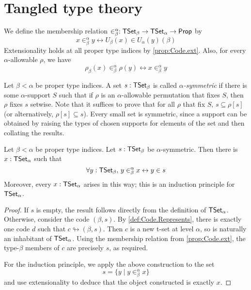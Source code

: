 \section{Tangled type theory}
\begin{definition}
  \label{def:TSet.mem}
  We define the membership relation \( \in^\alpha_\beta : \mathsf{TSet}_\beta \to \mathsf{TSet}_\alpha \to \mathsf{Prop} \) by
  \[ x \in^\alpha_\beta y \leftrightarrow U_\beta(x) \in U_\alpha(y)(\beta) \]
  Extensionality holds at all proper type indices by \cref{prop:Code.ext}.
  Also, for every \( \alpha \)-allowable \( \rho \), we have
  \[ \rho_\beta(x) \in^\alpha_\beta \rho(y) \leftrightarrow x \in^\alpha_\beta y \]
\end{definition}
\begin{definition}[symmetric]
  \label{def:Symmetric}
  Let \( \beta < \alpha \) be proper type indices.
  A set \( s : \mathsf{TSet}_\beta \) is called \emph{\( \alpha \)-symmetric} if there is some \( \alpha \)-support \( S \) such that if \( \rho \) is an \( \alpha \)-allowable permutation that fixes \( S \), then \( \rho \) fixes \( s \) setwise.
  Note that it suffices to prove that for all \( \rho \) that fix \( S \), \( s \subseteq \rho[s] \) (or alternatively, \( \rho[s] \subseteq s \)).
  Every small set is symmetric, since a support can be obtained by raising the types of chosen supports for elements of the set and then collating the results.
\end{definition}
\begin{proposition}
  \label{prop:TSet.of_symmetric}
  Let \( \beta < \alpha \) be proper type indices.
  Let \( s : \mathsf{TSet}_\beta \) be \( \alpha \)-symmetric.
  Then there is \( x : \mathsf{TSet}_\alpha \) such that
  \[ \forall y : \mathsf{TSet}_\beta,\, y \in_\beta^\alpha x \leftrightarrow y \in s \]
  Moreover, every \( x : \mathsf{TSet}_\alpha \) arises in this way; this is an induction principle for \( \mathsf{TSet}_\alpha \).
\end{proposition}
\begin{proof}
  If \( s \) is empty, the result follows directly from the definition of \( \mathsf{TSet}_\alpha \).
  Otherwise, consider the code \( (\beta, s) \).
  By \cref{def:Code.Represents}, there is exactly one code \( d \) such that \( c \looparrowright (\beta, s) \).
  Then \( c \) is a new t-set at level \( \alpha \), so is naturally an inhabitant of \( \mathsf{TSet}_\alpha \).
  Using the membership relation from \cref{prop:Code.ext}, the type-\( \beta \) members of \( c \) are precisely \( s \), as required.

  For the induction principle, we apply the above construction to the set
  \[ s = \{ y \mid y \in^\alpha_\beta x \} \]
  and use extensionality to deduce that the object constructed is exactly \( x \).
\end{proof}
